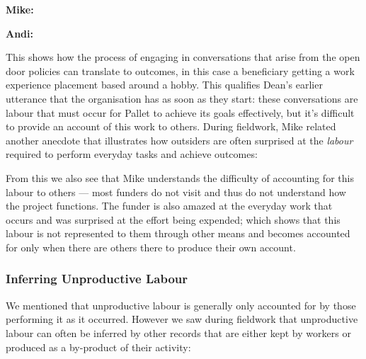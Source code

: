 \textbf{Mike:} 

\textbf{Andi:} 

This shows how the process of engaging in conversations that arise from the open door policies can translate to outcomes, in this case a beneficiary getting a work experience placement based around a hobby. This qualifies Dean's earlier utterance that the organisation has  as soon as they start: these conversations are labour that must occur for Pallet to achieve its goals effectively, but it's difficult to provide an account of this work to others. During fieldwork, Mike related another anecdote that illustrates how outsiders are often surprised at the \textit{labour} required to perform everyday tasks and achieve outcomes:


From this we also see that Mike understands the difficulty of accounting for this labour to others --- most funders do not visit and thus do not understand how the project functions. The funder is also amazed at the everyday work that occurs and was surprised at the effort being expended; which shows that this labour is not represented to them through other means and becomes accounted for only when there are others there to produce their own account.

\subsubsection{Inferring Unproductive Labour}
We mentioned that unproductive labour is generally only accounted for by those performing it as it occurred. However we saw during fieldwork that unproductive labour can often be inferred by other records that are either kept by workers or produced as a by-product of their activity:

